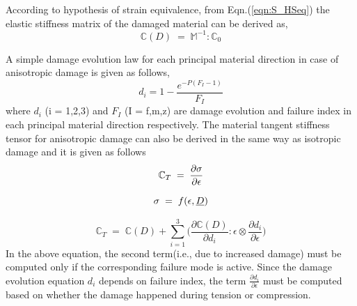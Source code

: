 \documentclass[a4paper,12pt]{extarticle}
\begin{document}
 According to hypothesis of strain equivalence, from Eqn.(\ref{eqn:S_HSeq}) the elastic stiffness matrix of the damaged material can be derived as,\\
 \begin{equation}
\mathbb{C}(D) \; = \; \mathbb{M}^{-1} : \mathbb{C}_{0}   
\label{Damaged_elasticity_matrix_2}
\end{equation}


A simple damage evolution law for each principal material direction in case of anisotropic damage is given as follows,
\begin{equation}
d_{i} = 1 - \frac{e^{-P(F_{I} - 1)} }{F_{I}}  
\end{equation}
where $d_{i}$ (i = 1,2,3) and $F_{I}$ (I = f,m,z) are damage evolution and failure index in each principal material direction respectively.
The material tangent stiffness tensor for anisotropic damage can also be derived in the same way as isotropic damage and it is given as follows
\begin{equation*}
\large{ \mathbb{C}_{T}  \; = \;\frac{\partial \sigma}{\partial \epsilon}  }
\end{equation*}

\begin{equation*}
\large{\sigma  \; = \; f(\epsilon, \underline{D}) }
\end{equation*}

\begin{equation}
\mathbb{C}_{T}  \; = \; \mathbb{C}(D) + \sum_{i = 1}^{3} \Big( \frac{\partial \mathbb{C}(D) }{\partial d_{i}} : \epsilon \otimes \frac{\partial d_{i}}{\partial \epsilon }\Big) 
\end{equation}
In the above equation, the second term(i.e., due to increased damage) must be computed only if the corresponding failure mode is active. Since the damage evolution equation $d_{i}$ depends on failure index, the term $\frac{\partial d_{i}}{\partial \epsilon }$ must be computed based on whether the damage happened during tension or compression.
\end{document}
